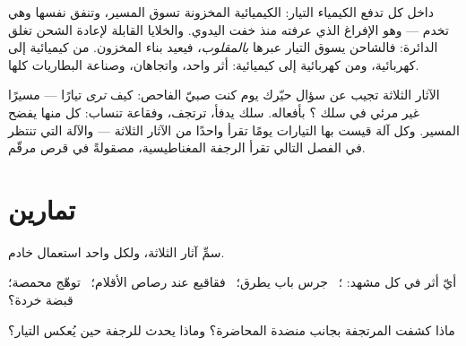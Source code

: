 \begin{example}\label{ex:g8:electric-current-effects:battery}
داخل كل  تدفع الكيمياء التيار:  الكيميائية
المخزونة تسوق المسير، وتنفق نفسها وهي تخدم --- وهو الإفراغ
الذي عرفته منذ خفت  اليدوي. والخلايا القابلة لإعادة
الشحن تغلق الدائرة: فالشاحن يسوق التيار عبرها
\emph{بالمقلوب}، فيعيد  بناء المخزون. من
كيميائية إلى كهربائية، ومن كهربائية إلى كيميائية: أثر واحد،
واتجاهان، وصناعة البطاريات كلها.
\end{example}

\begin{remark}\label{rem:g8:electric-current-effects:detect}
الآثار الثلاثة تجيب عن سؤال حيّرك يوم كنت صبيّ الفاحص: كيف
\emph{ترى} تيارًا --- مسيرًا غير مرئي في سلك ؟ بأفعاله.
سلك يدفأ،  ترتجف، وفقاعة تنساب: كل منها يفضح المسير. وكل
آلة قيست بها التيارات يومًا تقرأ واحدًا من الآثار الثلاثة ---
والآلة التي تنتظر في الفصل التالي تقرأ الرجفة المغناطيسية،
مصقولةً في قرص مرقّم.
\end{remark}

\section{تمارين}

\begin{exercise}[$\star$]\label{exo:g8:electric-current-effects:1}
سمِّ آثار  الثلاثة، ولكل واحد استعمال خادم.
\end{exercise}

\begin{exercise}[$\star$]\label{exo:g8:electric-current-effects:2}
أيّ أثر في كل مشهد:  ؛ \ جرس باب يطرق؛ \ فقاقيع عند
رصاص الأقلام؛ \ توهّج محمصة؛ \ قبضة  خردة؟
\end{exercise}

\begin{exercise}[$\star$]\label{exo:g8:electric-current-effects:3}
ماذا كشفت  المرتجفة بجانب منضدة المحاضرة؟ وماذا يحدث
للرجفة حين يُعكس التيار؟
\end{exercise}

